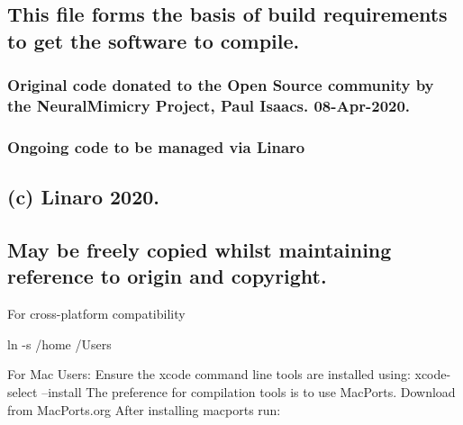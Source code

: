 \subsection*{This file forms the basis of build requirements to get the software to compile.}

\subsubsection*{Original code donated to the Open Source community by the Neural\+Mimicry Project, Paul Isaac\textquotesingle{}s. 08-\/\+Apr-\/2020.}

\subsubsection*{Ongoing code to be managed via Linaro}

\subsection*{(c) Linaro 2020.}

\subsection*{May be freely copied whilst maintaining reference to origin and copyright.}

For cross-\/platform compatibility


\begin{DoxyCode}
ln -s /home /Users
\end{DoxyCode}


For Mac Users\+: Ensure the xcode command line tools are installed using\+: xcode-\/select --install The preference for compilation tools is to use Mac\+Ports. Download from Mac\+Ports.\+org After installing macports run\+:


